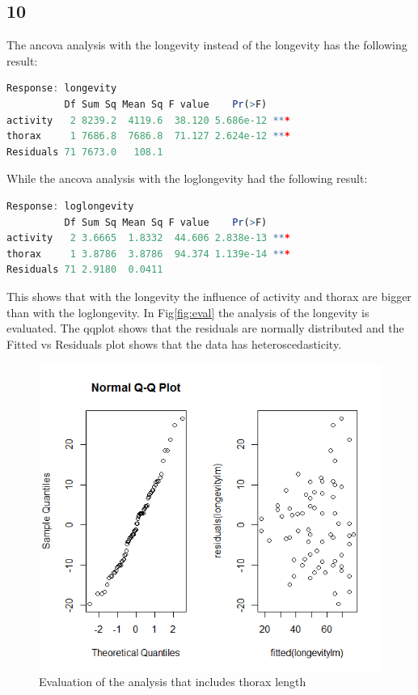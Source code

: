 \documentclass{article}
\begin{document}
    \subsection*{10}
      The ancova analysis with the longevity instead of the longevity has the following result:
      \begin{lstlisting}[language=R]
Response: longevity
          Df Sum Sq Mean Sq F value    Pr(>F)    
activity   2 8239.2  4119.6  38.120 5.686e-12 ***
thorax     1 7686.8  7686.8  71.127 2.624e-12 ***
Residuals 71 7673.0   108.1    
      \end{lstlisting}
      While the ancova analysis with the loglongevity had the following result:
      \begin{lstlisting}[language=R]
Response: loglongevity
          Df Sum Sq Mean Sq F value    Pr(>F)    
activity   2 3.6665  1.8332  44.606 2.838e-13 ***
thorax     1 3.8786  3.8786  94.374 1.139e-14 ***
Residuals 71 2.9180  0.0411             
      \end{lstlisting}
      This shows that with the longevity the influence of activity and thorax are bigger than with the loglongevity.
      In Fig\ref{fig:eval} the analysis of the longevity is evaluated.
      The qqplot shows that the residuals are normally distributed and the Fitted vs Residuals plot shows that the data has heteroscedasticity.
      \begin{figure}[H]
          \centering
          \includegraphics[scale=0.3]{../results/evalLongevity.png}
          \caption{Evaluation of the analysis that includes thorax length}
          \label{fig:evalLongevity}
      \end{figure}
    
\end{document}
